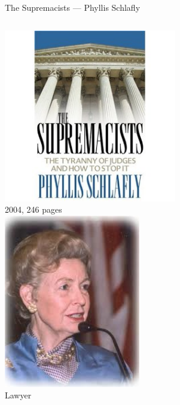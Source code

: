 \begin{frame}{The Supremacists --- Phyllis Schlafly}
    \begin{columns}[onlytextwidth]
            \centering
            \includegraphics[width=0.95\textwidth]{img/the-supremacists.png} \\
            2004, 246 pages \\

            \centering
            \includegraphics[width=0.75\textwidth]{img/phyllis-schlafly.png} \\
            Lawyer \\
    \end{columns}
\end{frame}

